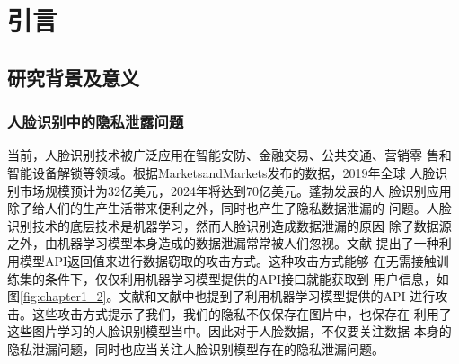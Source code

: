 
\chapter{引言}

\section{研究背景及意义}

\subsection{人脸识别中的隐私泄露问题}
当前，人脸识别技术被广泛应用在智能安防、金融交易、公共交通、营销零
售和智能设备解锁等领域。根据MarketsandMarkets发布的数据，2019年全球
人脸识别市场规模预计为32亿美元，2024年将达到70亿美元\cite{marketsmarkets2019}。蓬勃发展的人
脸识别应用除了给人们的生产生活带来便利之外，同时也产生了隐私数据泄漏的
问题。人脸识别技术的底层技术是机器学习，然而人脸识别造成数据泄漏的原因
除了数据源之外，由机器学习模型本身造成的数据泄漏常常被人们忽视。文献\cite{10.5555/3241094.3241142}
提出了一种利用模型API返回值来进行数据窃取的攻击方式。这种攻击方式能够
在无需接触训练集的条件下，仅仅利用机器学习模型提供的API接口就能获取到
用户信息，如图\ref{fig:chapter1_2}。文献\cite{10.5555/3241094.3241142}和文献\cite{10.1145/2810103.2813677}中也提到了利用机器学习模型提供的API
进行攻击。这些攻击方式提示了我们，我们的隐私不仅保存在图片中，也保存在
利用了这些图片学习的人脸识别模型当中。因此对于人脸数据，不仅要关注数据
本身的隐私泄漏问题，同时也应当关注人脸识别模型存在的隐私泄漏问题。

